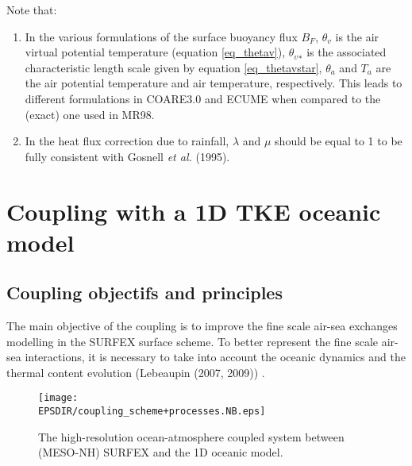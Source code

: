 Note that:
\begin{enumerate}
	\item In the various formulations of the surface buoyancy flux $B_F$, ${\theta}_v$ is the air virtual potential temperature
(equation \ref{eq_thetav}), ${{\theta}_v}_{*}$ is the associated characteristic length scale given by equation \ref{eq_thetavstar}, 
${\theta}_a$ and $T_a$ are the air potential temperature and air temperature, respectively. 
This leads to different formulations in COARE3.0 and ECUME when compared to the (exact) one used in MR98.
	\item In the heat flux correction due to rainfall, $\lambda$ and $\mu$ should be equal to 1 to be fully consistent with 
Gosnell \textit{et al.} (1995). %
\end{enumerate}


\newpage
\section{Coupling with a 1D TKE oceanic model}
\subsection{Coupling objectifs and principles}
The main objective of the coupling is to improve the fine scale air-sea exchanges modelling in the SURFEX surface scheme. To better represent the fine scale air-sea interactions, it is necessary to take into account the oceanic dynamics and the thermal content evolution (Lebeaupin \etal (2007, 2009)) %
. \\
\begin{figure}[!b]
\texttt{[image: \\EPSDIR/coupling\_scheme+processes.NB.eps]}
\vspace{-0.75cm}
\caption{The high-resolution ocean-atmosphere coupled system between (MESO-NH) SURFEX and the 1D oceanic model. \label{scheme_coupled_syst}}
\end{figure}
 
